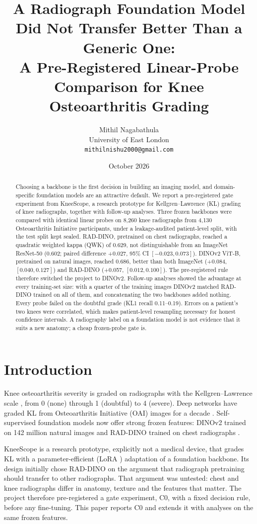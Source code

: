 \documentclass[11pt]{article}
\title{A Radiograph Foundation Model Did Not Transfer Better Than a Generic One:\\
\large A Pre-Registered Linear-Probe Comparison for Knee Osteoarthritis Grading}
\author{Mithil Nagabathula\\University of East London\\\texttt{mithilnishu2000@gmail.com}}
\date{October 2026}
\begin{document}
\maketitle

\begin{abstract}
Choosing a backbone is the first decision in building an imaging model, and domain-specific foundation models are an attractive
default. We report a pre-registered gate experiment from KneeScope, a research prototype for Kellgren--Lawrence (KL) grading of
knee radiographs, together with follow-up analyses. Three frozen backbones were compared with identical linear probes on 8{,}260
knee radiographs from 4{,}130 Osteoarthritis Initiative participants, under a leakage-audited patient-level split, with the test split
kept sealed. RAD-DINO, pretrained on chest radiographs, reached a quadratic weighted kappa (QWK) of 0.629, not distinguishable from an
ImageNet ResNet-50 (0.602; paired difference +0.027, 95\% CI \([-0.023, 0.073]\)). DINOv2 ViT-B, pretrained on natural images,
reached 0.686, better than both ImageNet (+0.084, \([0.040, 0.127]\)) and RAD-DINO (+0.057, \([0.012, 0.100]\)). The pre-registered
rule therefore switched the project to DINOv2. Follow-up analyses showed the advantage at every training-set size: with a quarter of
the training images DINOv2 matched RAD-DINO trained on all of them, and concatenating the two backbones added nothing. Every probe
failed on the doubtful grade (KL1 recall 0.11--0.19). Errors on a patient's two knees were correlated, which makes patient-level
resampling necessary for honest confidence intervals. A radiography label on a foundation model is not evidence that it suits a new
anatomy; a cheap frozen-probe gate is.
\end{abstract}

\section{Introduction}
Knee osteoarthritis severity is graded on radiographs with the Kellgren--Lawrence scale \cite{kellgren1957}, from 0 (none) through 1
(doubtful) to 4 (severe). Deep networks have graded KL from Osteoarthritis Initiative (OAI) images for a decade
\cite{antony2016,tiulpin2018,chen2019knee}. Self-supervised foundation models now offer strong frozen features: DINOv2 trained on 142
million natural images \cite{oquab2024dinov2} and RAD-DINO trained on chest radiographs \cite{perezgarcia2025raddino}.

KneeScope is a research prototype, explicitly not a medical device, that grades KL with a parameter-efficient (LoRA \cite{hu2022lora})
adaptation of a foundation backbone. Its design initially chose RAD-DINO on the argument that radiograph pretraining should transfer to
other radiographs. That argument was untested: chest and knee radiographs differ in anatomy, texture and the features that matter. The
project therefore pre-registered \cite{nosek2018prereg} a gate experiment, C0, with a fixed decision rule, before any fine-tuning.
This paper reports C0 and extends it with analyses on the same frozen features.
\end{document}

